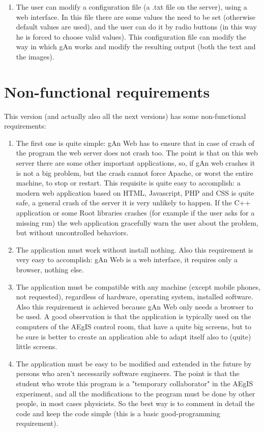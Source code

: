 \begin{enumerate}
\item The user can modify a configuration file (a .txt file on the server), using a web interface. In this file there are some values the need to be set (otherwise default values are used), and the user can do it by radio buttons (in this way he is forced to choose valid values). This configuration file can modify the way in which gAn works and modify the resulting output (both the text and the images).   

\end{enumerate}

 
\section{Non-functional requirements}

This version (and actually also all the next versions) has some non-functional requirements:

\begin{enumerate}

\item The first one is quite simple: gAn Web has to ensure that in case of crash of the program the web server does not crash too. The point is that on this web server there are some other important applications, so, if gAn web crashes it is not a big problem, but the crash cannot force Apache, or worst the entire machine, to stop or restart. 
This requisite is quite easy to accomplish: a modern web application based on HTML, Javascript, PHP and CSS is quite safe, a general crash of the server it is very unlikely to happen. If the C++ application or some Root libraries crashes (for example if the user asks for a missing run) the web application gracefully warn the user about the problem, but without uncontrolled behaviors.  

\item The application must work without install nothing. Also this requirement is very easy to accomplish: gAn Web is a web interface, it requires only a browser, nothing else.

\item The application must be compatible with any machine (except mobile phones, not requested), regardless of hardware, operating system, installed software. Also this requirement is achieved because gAn Web only needs a browser to be used. A good observation is that the application is typically used on the computers of the AEgIS control room, that have a quite big screens, but to be sure is better to create an application able to adapt itself also to (quite) little screens.  

\item The application must be easy to be modified and extended in the future by persons who aren't necessarily software engineers. The point is that the student who wrote this program is a "temporary collaborator" in the AEgIS experiment, and all the modifications to the program must be done by other people, in most cases physicists. So the best way is to comment in detail the code and keep the code simple (this is a basic good-programming requirement).   


\end{enumerate}

